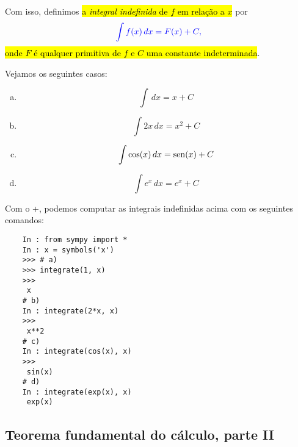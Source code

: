 Com isso, definimos \hl{a \emph{integral indefinida} de $f$ em relação a $x$} por
\begin{equation}\color{blue}\int f(x)\,dx = F(x) + C,
\end{equation}
\hl{onde $F$ é qualquer primitiva de $f$ e $C$ uma constante indeterminada}.

\begin{ex}
  Vejamos os seguintes casos:
  \begin{enumerate}[a)]
  \item
    \begin{equation}
      \int \,dx = x + C
    \end{equation}
  \item
    \begin{equation}
      \int 2x\,dx = x^2 + C
    \end{equation}
  \item
    \begin{equation}
      \int \cos(x)\,dx = \operatorname{sen}(x) + C
    \end{equation}
  \item
    \begin{equation}
      \int e^x\,dx = e^x + C
    \end{equation}
  \end{enumerate}
  \ifispython
  Com o {\python}+{\sympy}, podemos computar as integrais indefinidas acima com os seguintes comandos:
  \begin{lstlisting}
    In : from sympy import *
    In : x = symbols('x')
    >>> # a)
    >>> integrate(1, x)
    >>> 
     x
    # b)
    In : integrate(2*x, x)
    >>> 
     x**2
    # c)
    In : integrate(cos(x), x)
    >>> 
     sin(x)
    # d)
    In : integrate(exp(x), x)
     exp(x)
  \end{lstlisting}
  \fi  
\end{ex}

\subsection{Teorema fundamental do cálculo, parte II}


